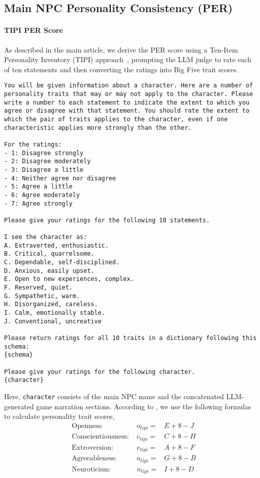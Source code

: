 \subsection{Main NPC Personality Consistency (PER)}\label{app:per_eval}
\paragraph{TIPI PER Score} As described in the main article, we derive the PER score using a Ten-Item Personality Inventory (TIPI) approach~\cite{gosling2003very,cao2024large}, prompting the LLM judge to rate each of ten statements and then converting the ratings into Big Five trait scores.
\begin{center}
\begin{minipage}{0.95\textwidth}
\begin{lstlisting}[language=plaintext, frame=none, numbers=none]
You will be given information about a character. Here are a number of personality traits that may or may not apply to the character. Please write a number to each statement to indicate the extent to which you agree or disagree with that statement. You should rate the extent to which the pair of traits applies to the character, even if one characteristic applies more strongly than the other.

For the ratings:
- 1: Disagree strongly
- 2: Disagree moderately
- 3: Disagree a little
- 4: Neither agree nor disagree
- 5: Agree a little
- 6: Agree moderately
- 7: Agree strongly

Please give your ratings for the following 10 statements.

I see the character as:
A. Extraverted, enthusiastic.
B. Critical, quarrelsome.
C. Dependable, self-disciplined.
D. Anxious, easily upset.
E. Open to new experiences, complex.
F. Reserved, quiet.
G. Sympathetic, warm.
H. Disorganized, careless.
I. Calm, emotionally stable.
J. Conventional, uncreative

Please return ratings for all 10 traits in a dictionary following this schema:
{schema}

Please give your ratings for the following character.
{character}
\end{lstlisting}
\end{minipage}
\end{center}
Here, \texttt{character} consists of the main NPC name and the concatenated LLM-generated game narration sections. According to \citet{gosling2003very}, we use the following formulas to calculate personality trait scores,
\begin{equation}
    \begin{aligned}
        &\text{Openness: }&o_{tipi} =& E + 8 - J\\
        &\text{Conscientiousness: }&c_{tipi} =& C + 8 - H\\
        &\text{Extroversion: }&e_{tipi} =& A + 8 - F\\
        &\text{Agreeableness: }&a_{tipi} =& G + 8 - B\\
        &\text{Neuroticism: }&n_{tipi} =& I + 8 - D\\
    \end{aligned}
\end{equation}

